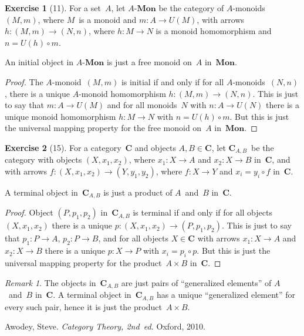 \documentclass[letterpaper,12pt]{article}
\newcommand{\Mon}{\mathbf{Mon}}
\newcommand{\after}{\circ}
\newcommand{\cat}[1]{\mathbf{#1}}
\theoremstyle{definition}
\newtheorem*{exer}{Exercise}
\theoremstyle{remark}
\newtheorem*{rmk}{Remark}
\theoremstyle{direction}
\begin{document}
\begin{exer}[11]
For a set~\(A\), let \(A\text{-}\Mon\) be the category of \(A\)-monoids \((M,m)\), where \(M\)~is a monoid and \(m:A\to U(M)\), with arrows \(h:(M,m)\to(N,n)\), where \(h:M\to N\) is a monoid homomorphism and \(n=U(h)\after m\).

An initial object in \(A\text{-}\Mon\) is just a free monoid on~\(A\) in~\(\Mon\).
\end{exer}
\begin{proof}
The \(A\)-monoid~\((M,m)\) is initial if and only if for all \(A\)-monoids~\((N,n)\), there is a unique \(A\)-monoid homomorphism \(h:(M,m)\to(N,n)\). This is just to say that \(m:A\to U(M)\) and for all monoids~\(N\) with \(n:A\to U(N)\) there is a unique monoid homomorphism \(h:M\to N\) with \(n=U(h)\after m\). But this is just the universal mapping property for the free monoid on~\(A\) in~\(\Mon\).
\end{proof}

\begin{exer}[15]
For a category~\(\cat{C}\) and objects \(A,B\in\cat{C}\), let \(\cat{C}_{A,B}\)~be the category with objects \((X,x_1,x_2)\), where \(x_1:X\to A\) and \(x_2:X\to B\) in~\(\cat{C}\), and with arrows \(f:(X,x_1,x_2)\to(Y,y_1,y_2)\), where \(f:X\to Y\) and \(x_i=y_i\after f\) in~\(\cat{C}\).

A terminal object in~\(\cat{C}_{A,B}\) is just a product of \(A\)~and~\(B\) in~\(\cat{C}\).
\end{exer}
\begin{proof}
Object \((P,p_1,p_2)\) in~\(\cat{C}_{A,B}\) is terminal if and only if for all objects \((X,x_1,x_2)\) there is a unique \(p:(X,x_1,x_2)\to(P,p_1,p_2)\). This is just to say that \(p_1:P\to A\), \(p_2:P\to B\), and for all objects \(X\in\cat{C}\) with arrows \(x_1:X\to A\) and \(x_2:X\to B\) there is a unique \(p:X\to P\) with \(x_i=p_i\after p\). But this is just the universal mapping property for the product~\(A\times B\) in~\(\cat{C}\).
\end{proof}
\begin{rmk}
The objects in~\(\cat{C}_{A,B}\) are just pairs of ``generalized elements'' of \(A\)~and~\(B\) in~\(\cat{C}\). A terminal object in~\(\cat{C}_{A,B}\) has a unique ``generalized element'' for every such pair, hence it is just the product~\(A\times B\).
\end{rmk}

\begin{thebibliography}{0}
 Awodey, Steve. \textit{Category Theory, 2nd~ed.} Oxford, 2010.
\end{thebibliography}
\end{document}
